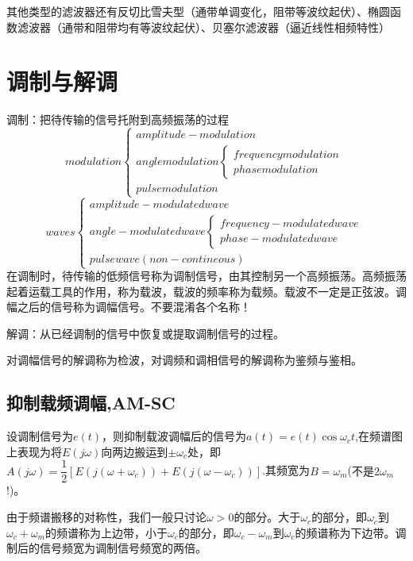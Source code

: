 其他类型的滤波器还有反切比雪夫型（通带单调变化，阻带等波纹起伏）、椭圆函数滤波器（通带和阻带均有等波纹起伏）、贝塞尔滤波器（逼近线性相频特性）
\section{调制与解调}
调制：把待传输的信号托附到高频振荡的过程
\begin{equation}
    modulation
    \begin{cases}
        amplitude-modulation\\
        angle modulation\begin{cases}
            frequency modulation\\
            phase modulation
        \end{cases}\\
        pulse modulation
    \end{cases}
\end{equation}
\begin{equation}
    waves
    \begin{cases}
        amplitude-modulated wave\\
        angle-modulated wave\begin{cases}
            frequency-modulated wave\\
            phase-modulated wave
        \end{cases}\\
        pulse wave (non-contineous)
    \end{cases}
\end{equation}
在调制时，待传输的低频信号称为调制信号，由其控制另一个高频振荡。高频振荡起着运载工具的作用，称为载波，载波的频率称为载频。载波不一定是正弦波。调幅之后的信号称为调幅信号。{\color{red}不要混淆各个名称！}

解调：从已经调制的信号中恢复或提取调制信号的过程。

对调幅信号的解调称为检波，对调频和调相信号的解调称为鉴频与鉴相。
\subsection{抑制载频调幅,AM-SC}
设调制信号为$e(t)$，则抑制载波调幅后的信号为$a(t)=e(t)\cos \omega_c t$,在频谱图上表现为将$E(j\omega)$向两边搬运到$\pm \omega_c$处，即$A(j\omega)=\dfrac{1}{2}[E(j(\omega+\omega_c))+E(j(\omega-\omega_c))]$.其频宽为$B=\omega_m$({\color{red}不是$2\omega_m$!})。

由于频谱搬移的对称性，我们一般只讨论$\omega>0$的部分。大于$\omega_c$的部分，即$\omega_c$到$\omega_c+\omega_m$的频谱称为上边带，小于$\omega_c$的部分，即$\omega_c-\omega_m$到$\omega_c $的频谱称为下边带。调制后的信号频宽为调制信号频宽的两倍。

